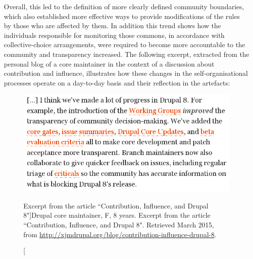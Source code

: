 Overall, this led to the definition of more clearly defined community boundaries, which also established more effective ways to provide modifications of the rules by those who are affected by them. In addition this trend shows how the individuals responsible for monitoring those commons, in accordance with collective-choice arrangements, were required to become more accountable to the community and transparency increased. The following excerpt, extracted from the personal blog of a core maintainer in the context of a discussion about contribution and influence, illustrates how these changes in the self-organisational processes operate on a day-to-day basis and their reflection in the artefacts:

\begin{figure}[H]
\centering
\includegraphics[scale=0.45]{img/quotes_replacement/contribution-influence-drupal-8.png}
\caption[Excerpt from the article ``Contribution, Influence, and Drupal 8"]{Drupal core maintainer, F, 8 years. Excerpt from the article ``Contribution, Influence, and Drupal 8". Retrieved  March 2015, from \url{http://xjmdrupal.org/blog/contribution-influence-drupal-8}.}
\label{quote_core_influence}
\end{figure}


